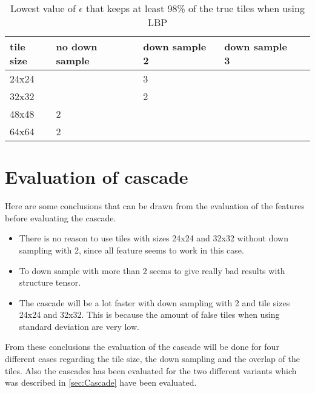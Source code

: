 \begin{table}[H]
\begin{center}
     \begin{tabular}{ | l | l | l | l | l |}
     \hline
     tile size & no down sample & down sample 2 & down sample 3 \\ \hline
   	 24x24 &  & 3 & 		\\ \hline
     32x32 &  & 2 & 			\\ \hline
     48x48 & 2 &     &  		\\ \hline
     64x64 & 2 &     &			\\ \hline
     \end{tabular}
\end{center}
\caption{Lowest value of $\epsilon$ that keeps at least 98\% of the true tiles when using LBP}
\end{table}


\section{Evaluation of cascade}
\label{sec:Evalutaion of cascade}
Here are some conclusions that can be drawn from the evaluation of the features before evaluating the cascade.

\begin{itemize}
\item There is no reason to use tiles with sizes 24x24 and 32x32 without down sampling with 2, since all feature seems to work in this case.

\item To down sample with more than 2 seems to give really bad results with structure tensor.

\item The cascade will be a lot faster with down sampling with 2 and tile sizes 24x24 and 32x32. This is because the amount of false tiles when using standard deviation are very low.
\end{itemize}

From these conclusions the evaluation of the cascade will be done for four different cases regarding the tile size, the down sampling and the overlap of the tiles. Also the cascades has been evaluated for the two different variants which was described in \ref{sec:Cascade} have been evaluated. 


